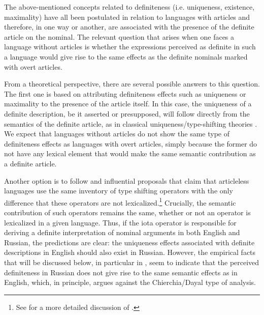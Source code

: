 \documentclass[output=paper,colorlinks,citecolor=brown]{langscibook}
\begin{document}

The above-mentioned concepts related to definiteness (i.e. uniqueness, existence, maximality) have all been postulated in relation to languages with articles and therefore, in one way or another, are associated with the presence of the definite article on the nominal. The relevant question that arises when one faces a language without articles is whether the expressions perceived as definite in such a language would give rise to the same effects as the definite nominals marked with overt articles. 

From a theoretical perspective, there are several possible answers to this question. The first one is based on attributing definiteness effects such as uniqueness or maximality to the presence of the article itself. In this case, the uniqueness of a definite description, be it asserted or presupposed, will follow directly from the semantics of the definite article, as in classical uniqueness/type-shifting theories \citep[e.g.,][]{frege92, russell05, partee87}. We expect that languages without articles do not show the same type of definiteness effects as languages with overt articles, simply because the former do not have any lexical element that would make the same semantic contribution as a definite article. 

Another option is to follow  and  influential proposals that claim that articleless languages use the same inventory of type shifting operators with the only difference that these operators are not lexicalized.\footnote{See  for a more detailed discussion of \citet{dayal04}.} Crucially, the semantic contribution of such operators remains the same, whether or not an operator is lexicalized in a given language. Thus, if the iota operator is responsible for deriving a definite interpretation of nominal arguments in both English and Russian, the predictions are clear: the uniqueness effects associated with definite descriptions in English should also exist in Russian. However, the empirical facts that will be discussed below, in particular in , seem to indicate that the perceived definiteness in Russian does not give rise to the same semantic effects as in English, which, in principle, argues against the Chierchia/Dayal type of analysis.
 
\end{document}
